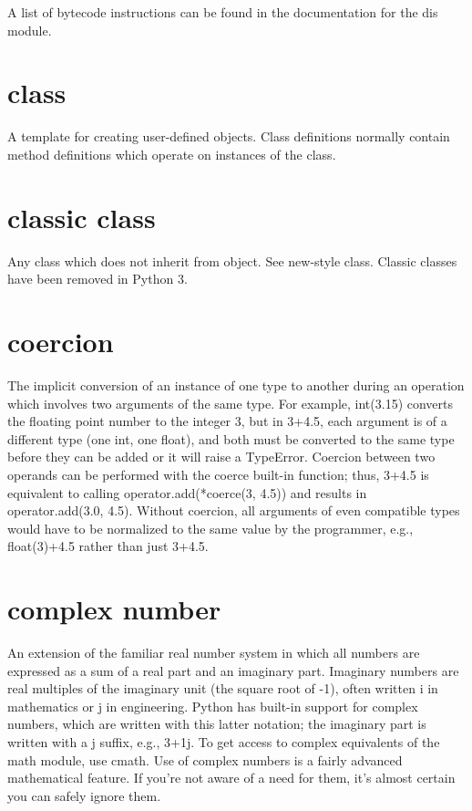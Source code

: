 \documentclass[12pt,a4paper,final,twoside,onecolumn,titlepage]{book}
\begin{document}
A list of bytecode instructions can be found in the documentation for the dis module.

\section{class}
A template for creating user-defined objects. Class definitions normally contain method definitions which operate on instances of the class.

\section{classic class}
Any class which does not inherit from object. See new-style class. Classic classes have been removed in Python 3.

\section{coercion}
The implicit conversion of an instance of one type to another during an operation which involves two arguments of the same type. For example, int(3.15) converts the floating point number to the integer 3, but in 3+4.5, each argument is of a different type (one int, one float), and both must be converted to the same type before they can be added or it will raise a TypeError. Coercion between two operands can be performed with the coerce built-in function; thus, 3+4.5 is equivalent to calling operator.add(*coerce(3, 4.5)) and results in operator.add(3.0, 4.5). Without coercion, all arguments of even compatible types would have to be normalized to the same value by the programmer, e.g., float(3)+4.5 rather than just 3+4.5.

\section{complex number}
An extension of the familiar real number system in which all numbers are expressed as a sum of a real part and an imaginary part. Imaginary numbers are real multiples of the imaginary unit (the square root of -1), often written i in mathematics or j in engineering. Python has built-in support for complex numbers, which are written with this latter notation; the imaginary part is written with a j suffix, e.g., 3+1j. To get access to complex equivalents of the math module, use cmath. Use of complex numbers is a fairly advanced mathematical feature. If you’re not aware of a need for them, it’s almost certain you can safely ignore them.
\end{document}
